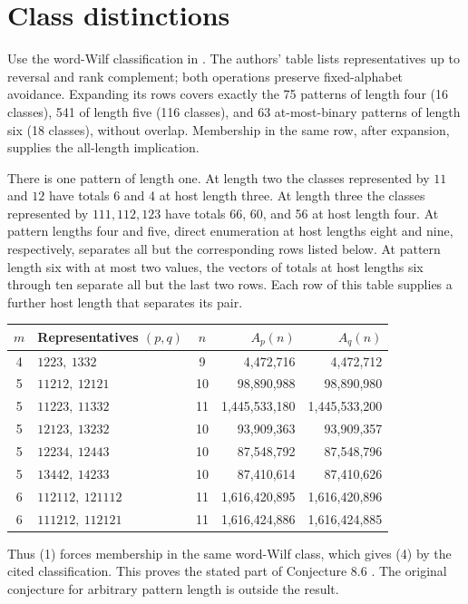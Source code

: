 \documentclass[10pt]{article}
\begin{document}
\section{Class distinctions}
Use the word-Wilf classification in \cite[\S\S1.1, 1.4 and Appendix A]{jm}.
The authors' table \cite{table} lists representatives up to reversal and
rank complement; both operations preserve fixed-alphabet avoidance.
Expanding its rows covers exactly the 75 patterns of length four
(16 classes), 541 of length five (116 classes), and 63 at-most-binary
patterns of length six (18 classes), without overlap. Membership in
the same row, after expansion, supplies the all-length implication.

There is one pattern of length one. At length two the classes represented
by $11$ and $12$ have totals 6 and 4 at host length three. At length three
the classes represented by $111,112,123$ have totals 66, 60, and 56
at host length four. At pattern lengths four and five, direct enumeration
at host lengths eight and nine, respectively, separates all but the
corresponding rows listed below. At pattern length six with at most two
values, the vectors of totals at host lengths six through ten separate
all but the last two rows. Each row of this table supplies a further
host length that separates its pair.
\begin{center}
\begin{tabular}{clcrr}
\toprule
$m$ & Representatives $(p,q)$ & $n$ & $A_p(n)$ & $A_q(n)$\\
\midrule
4 & $1223,\ 1332$ & 9 & 4,472,716 & 4,472,712\\
5 & $11212,\ 12121$ & 10 & 98,890,988 & 98,890,980\\
5 & $11223,\ 11332$ & 11 & 1,445,533,180 & 1,445,533,200\\
5 & $12123,\ 13232$ & 10 & 93,909,363 & 93,909,357\\
5 & $12234,\ 12443$ & 10 & 87,548,792 & 87,548,796\\
5 & $13442,\ 14233$ & 10 & 87,410,614 & 87,410,626\\
6 & $112112,\ 121112$ & 11 & 1,616,420,895 & 1,616,420,896\\
6 & $111212,\ 112121$ & 11 & 1,616,424,886 & 1,616,424,885\\
\bottomrule
\end{tabular}
\end{center}
Thus (1) forces membership in the same word-Wilf class, which gives (4)
by the cited classification. This proves the stated part of Conjecture
8.6 \cite[p.~295]{cceg}. The original conjecture for arbitrary pattern
length is outside the result.
\end{document}
